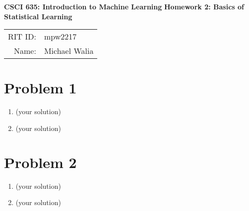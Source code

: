 \documentclass[12pt]{article}
\begin{document}
\hrulefill
\begin{center}
\textbf{{\Large CSCI 635: Introduction to Machine Learning}}
\textbf{{\Large Homework 2: Basics of Statistical Learning}}

\begin{tabular}{rl}

RIT ID: & mpw2217 \\
Name: & Michael Walia \\
\end{tabular}
\end{center}
\hrulefill
\section*{Problem 1}

\begin{enumerate}[label=(\alph*)]
  \item (your solution)
  \item (your solution)
\end{enumerate}

\section*{Problem 2}

\begin{enumerate}[label=(\alph*)]
  \item (your solution)
  \item (your solution)
\end{enumerate}
\end{document}

